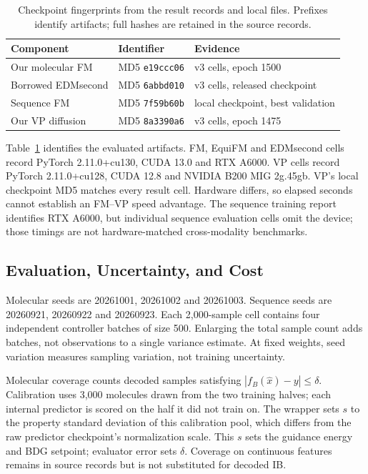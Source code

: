 \documentclass{article}
\begin{document}
\begin{table}[!htbp]
\centering\small
\caption{Checkpoint fingerprints from the result records and local files. Prefixes identify artifacts; full hashes are retained in the source records.}
\label{tab:hashes}
\begin{tabular}{lll}
\toprule
Component & Identifier & Evidence\\
\midrule
Our molecular FM & MD5 \texttt{e19ccc06} & v3 cells, epoch 1500\\
Borrowed EDMsecond & MD5 \texttt{6abbd010} & v3 cells, released checkpoint\\
Sequence FM & MD5 \texttt{7f59b60b} & local checkpoint, best validation\\
Our VP diffusion & MD5 \texttt{8a3390a6} & v3 cells, epoch 1475\\
\bottomrule
\end{tabular}
\end{table}
Table~\ref{tab:hashes} identifies the evaluated artifacts. FM, EquiFM and EDMsecond cells record PyTorch 2.11.0+cu130, CUDA 13.0 and RTX A6000. VP cells record PyTorch 2.11.0+cu128, CUDA 12.8 and NVIDIA B200 MIG 2g.45gb. VP's local checkpoint MD5 matches every result cell. Hardware differs, so elapsed seconds cannot establish an FM--VP speed advantage. The sequence training report identifies RTX A6000, but individual sequence evaluation cells omit the device; those timings are not hardware-matched cross-modality benchmarks.

\subsection{Evaluation, Uncertainty, and Cost}\label{app:evaluation}
Molecular seeds are 20261001, 20261002 and 20261003. Sequence seeds are 20260921, 20260922 and 20260923. Each 2,000-sample cell contains four independent controller batches of size 500. Enlarging the total sample count adds batches, not observations to a single variance estimate. At fixed weights, seed variation measures sampling variation, not training uncertainty.

Molecular coverage counts decoded samples satisfying $|f_B(\hat x)-y|\le\delta$. Calibration uses 3,000 molecules drawn from the two training halves; each internal predictor is scored on the half it did not train on. The wrapper sets $s$ to the property standard deviation of this calibration pool, which differs from the raw predictor checkpoint's normalization scale. This $s$ sets the guidance energy and BDG setpoint; evaluator error sets $\delta$. Coverage on continuous features remains in source records but is not substituted for decoded IB.
\end{document}
